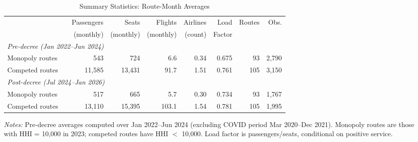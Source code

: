 \begin{table}[t]
\centering
\caption{Summary Statistics: Route-Month Averages}
\label{tab:summ}
\small
\begin{tabular}{llrrrrrrr}
\toprule
 & & Passengers & Seats & Flights & Airlines & Load & Routes & Obs. \\
 & & (monthly) & (monthly) & (monthly) & (count) & Factor & & \\
\midrule
\multicolumn{9}{l}{\textit{Pre-decree (Jan 2022--Jun 2024)}} \\
\quad Monopoly routes & & 543 & 724 & 6.6 & 0.34 & 0.675 & 93 & 2,790 \\
\quad Competed routes & & 11,585 & 13,431 & 91.7 & 1.51 & 0.761 & 105 & 3,150 \\
\midrule
\multicolumn{9}{l}{\textit{Post-decree (Jul 2024--Jan 2026)}} \\
\quad Monopoly routes & & 517 & 665 & 5.7 & 0.30 & 0.734 & 93 & 1,767 \\
\quad Competed routes & & 13,110 & 15,395 & 103.1 & 1.54 & 0.781 & 105 & 1,995 \\
\bottomrule
\end{tabular}
\begin{tablenotes}
\item \textit{Notes:} Pre-decree averages computed over Jan 2022--Jun 2024 (excluding COVID period Mar 2020--Dec 2021). Monopoly routes are those with HHI = 10,000 in 2023; competed routes have HHI $<$ 10,000. Load factor is passengers/seats, conditional on positive service.
\end{tablenotes}
\end{table}
